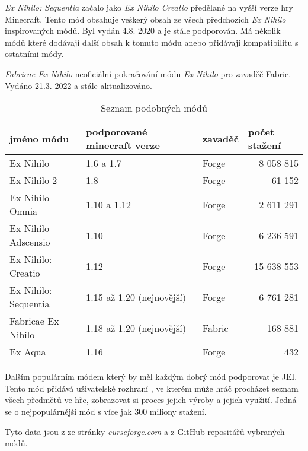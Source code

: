 \documentclass[FM,Proj,bw]{tulthesis}
\begin{document}
\par    \textit{Ex Nihilo: Sequentia} začalo jako  \textit{Ex Nihilo Creatio} předělané na vyšší 
verze hry Minecraft. Tento mód obsahuje veškerý obsah ze všech předchozích \textit{Ex Nihilo} inspirovaných módů. Byl vydán 4.8. 2020 a je stále podporován. Má několik módů které dodávají další obsah k tomuto módu anebo přidávají kompatibilitu s ostatními módy. 
\par    \textit{Fabricae Ex Nihilo} neoficiální pokračování módu  \textit{Ex Nihilo} pro zavaděč Fabric. Vydáno 21.3. 2022 a stále aktualizováno.


\begin{table}[]
\caption{Seznam podobných módů}
\begin{tabular}{lllr}
\hline
\multicolumn{1}{|l|}{jméno módu} & \multicolumn{1}{l|}{podporované minecraft verze} & \multicolumn{1}{l|}{zavaděč} & \multicolumn{1}{l|}{počet stažení} \\ \hline
Ex Nihilo                        & 1.6 a 1.7                                        & Forge                        & 8 058 815                          \\
Ex Nihilo 2                      & 1.8                                              & Forge                        & 61 152                             \\
Ex Nihilo Omnia                  & 1.10 a 1.12                                      & Forge                        & 2 611 291                          \\
Ex Nihilo Adscensio              & 1.10                                             & Forge                        & 6 236 591                          \\
Ex Nihilo: Creatio               & 1.12                                             & Forge                        & 15 638 553                         \\
Ex Nihilo: Sequentia             & 1.15 až 1.20 (nejnovější)                        & Forge                        & 6 761 281                          \\
Fabricae Ex Nihilo               & 1.18 až 1.20 (nejnovější)                        & Fabric                       & 168 881                            \\
Ex Aqua                          & 1.16                                             & Forge                        & 432                               
\end{tabular}
\end{table}
\par Dalším populárním módem který by měl každým dobrý mód podporovat je JEI. Tento mód přidává uživatelské rozhraní , ve kterém může hráč procházet seznam všech předmětů ve hře, zobrazovat si proces jejich výroby a jejich využití. Jedná se o nejpopulárnější mód s více jak 300 miliony stažení. 
\par Tyto data jsou z ze stránky \textit{curseforge.com} a z GitHub repositářů vybraných módů.  \cite{curseforge} \cite{github}
  \begin{comment}   
zmínit jei anebo ho odstanit ze 4 kapitoly
zmínit vydání na curse forge a dostupnost na githubu + dokumentace
\end{comment}
\end{document}
